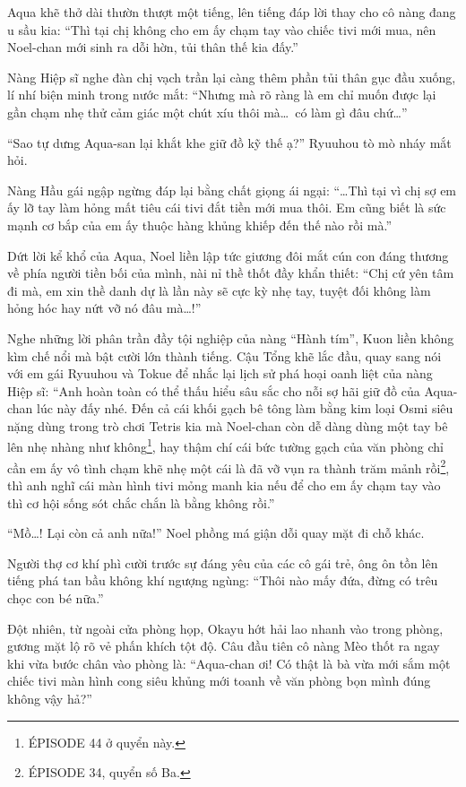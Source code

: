 \documentclass[../main.tex]{subfiles}
\begin{document}
Aqua khẽ thở dài thườn thượt một tiếng, lên tiếng đáp lời thay cho cô nàng đang u sầu kia: ``Thì tại chị không cho em ấy chạm tay vào chiếc tivi mới mua, nên Noel-chan mới sinh ra dỗi hờn, tủi thân thế kia đấy.''

Nàng Hiệp sĩ nghe đàn chị vạch trần lại càng thêm phần tủi thân gục đầu xuống, lí nhí biện minh trong nước mắt: ``Nhưng mà rõ ràng là em chỉ muốn được lại gần chạm nhẹ thử cảm giác một chút xíu thôi mà\dots\ có làm gì đâu chứ\dots''

``Sao tự dưng Aqua-san lại khắt khe giữ đồ kỹ thế ạ?'' Ryuuhou tò mò nháy mắt hỏi.

Nàng Hầu gái ngập ngừng đáp lại bằng chất giọng ái ngại: ``\dots Thì tại vì chị sợ em ấy lỡ tay làm hỏng mất tiêu cái tivi đắt tiền mới mua thôi. Em cũng biết là sức mạnh cơ bắp của em ấy thuộc hàng khủng khiếp đến thế nào rồi mà.''

Dứt lời kể khổ của Aqua, Noel liền lập tức giương đôi mắt cún con đáng thương về phía người tiền bối của mình, nài nỉ thề thốt đầy khẩn thiết: ``Chị cứ yên tâm đi mà, em xin thề danh dự là lần này sẽ cực kỳ nhẹ tay, tuyệt đối không làm hỏng hóc hay nứt vỡ nó đâu mà\dots!''

Nghe những lời phân trần đầy tội nghiệp của nàng ``Hành tím'', Kuon liền không kìm chế nổi mà bật cười lớn thành tiếng. Cậu Tổng khẽ lắc đầu, quay sang nói với em gái Ryuuhou và Tokue để nhắc lại lịch sử phá hoại oanh liệt của nàng Hiệp sĩ: ``Anh hoàn toàn có thể thấu hiểu sâu sắc cho nỗi sợ hãi giữ đồ của Aqua-chan lúc này đấy nhé. Đến cả cái khối gạch bê tông làm bằng kim loại Osmi siêu nặng dùng trong trò chơi Tetris kia mà Noel-chan còn dễ dàng dùng một tay bê lên nhẹ nhàng như không\footnote{{\flaregothic ÉPISODE 44} ở quyển này.}, hay thậm chí cái bức tường gạch của văn phòng chỉ cần em ấy vô tình chạm khẽ nhẹ một cái là đã vỡ vụn ra thành trăm mảnh rồi\footnote{{\flaregothic ÉPISODE 34}, quyển số Ba.}, thì anh nghĩ cái màn hình tivi mỏng manh kia nếu để cho em ấy chạm tay vào thì cơ hội sống sót chắc chắn là bằng không rồi.''

``Mồ\dots! Lại còn cả anh nữa!'' Noel phồng má giận dỗi quay mặt đi chỗ khác.

Người thợ cơ khí phì cười trước sự đáng yêu của các cô gái trẻ, ông ôn tồn lên tiếng phá tan bầu không khí ngượng ngùng: ``Thôi nào mấy đứa, đừng có trêu chọc con bé nữa.''

Đột nhiên, từ ngoài cửa phòng họp, Okayu hớt hải lao nhanh vào trong phòng, gương mặt lộ rõ vẻ phấn khích tột độ. Câu đầu tiên cô nàng Mèo thốt ra ngay khi vừa bước chân vào phòng là: ``Aqua-chan ơi! Có thật là bà vừa mới sắm một chiếc tivi màn hình cong siêu khủng mới toanh về văn phòng bọn mình đúng không vậy hả?''
\end{document}
